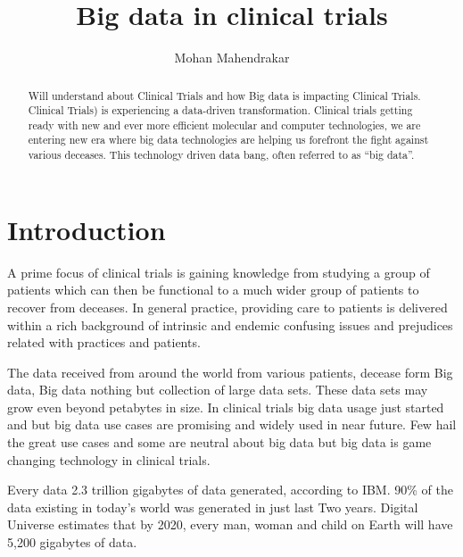 \documentclass[sigconf]{acmart}
\begin{document}
\title{Big data in clinical trials}
\author{Mohan Mahendrakar}

\renewcommand{\shortauthors}{B. Trovato et al.}


\begin{abstract}
Will understand about Clinical Trials and how Big
data is impacting Clinical Trials. Clinical Trials) is experiencing a
data-driven transformation. Clinical trials getting ready with new and 
ever more efficient molecular and computer technologies, we are entering
new era where big data technologies are helping us forefront the fight 
against various deceases. This technology driven data bang, often 
referred to as ``big data''.
\end{abstract}


\maketitle

\section{Introduction}
A prime focus of clinical trials is gaining knowledge from studying
a group of patients which can then be functional to a much wider group of
patients to recover from deceases. In general practice, providing care 
to patients is delivered within a rich background of intrinsic and
endemic confusing issues and prejudices related with practices and 
patients\cite{TR02}.

The data received from around the world from various patients, 
decease form Big data, Big data nothing but collection of large 
data sets. These data sets may grow even beyond petabytes in size.  
In clinical trials big data usage just started and but big data use
cases are promising and widely used in near future. Few hail the great
use cases and some are neutral about big data but big data is game 
changing technology in clinical trials\cite{TR05}. 

Every data 2.3 trillion gigabytes of data generated, according to IBM. 
90\% of the data existing in today’s world was generated in just last 
Two years. Digital Universe estimates that by 2020, every man, woman
and child on Earth will have 5,200 gigabytes of data.
\end{document}
